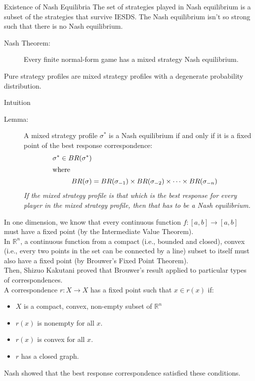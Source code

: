 \documentclass[10pt]{extarticle}
\begin{document}
  \begin{problem}{Existence of Nash Equilibria}
    The set of strategies played in Nash equilibrium is a subset of the strategies that survive IESDS. The Nash equilibrium isn't so strong such that there is no Nash equilibrium.

    \begin{description}
      \item[Nash Theorem:] Every finite normal-form game has a mixed strategy Nash equilibrium.
    \end{description}
    \begin{description}
      \tiny
      \item[Note:] Pure strategy profiles are mixed strategy profiles with a degenerate probability distribution.
    \end{description}
    \begin{problem}{Intuition}
      \begin{description}
        \item[Lemma:] A mixed strategy profile $\sigma^*$ is a Nash equilibrium if and only if it is a fixed point of the best response correspondence:
          \begin{align*}
            \sigma^* \in BR(\sigma^*)\\
            \shortintertext{where}
            BR(\sigma) &= BR(\sigma_{-1}) \times BR(\sigma_{-2})\times\cdots\times BR(\sigma_{-n})
          \end{align*}
          \textit{If the mixed strategy profile is that which is the best response for every player in the mixed strategy profile, then that has to be a Nash equilibrium.}
      \end{description}
      In one dimension, we know that every continuous function $f: [a,b] \rightarrow [a,b]$ must have a fixed point (by the Intermediate Value Theorem).\\

      In $\mathbb{R}^n$, a continuous function from a compact (i.e., bounded and closed), convex (i.e., every two points in the set can be connected by a line) subset to itself must also have a fixed point (by Brouwer's Fixed Point Theorem).\\

      Then, Shizuo Kakutani proved that Brouwer's result applied to particular types of correspondences.\\

      A correspondence $r: X\rightarrow X$ has a fixed point such that $x\in r(x)$ if:
      \begin{itemize}
        \item $X$ is a compact, convex, non-empty subset of $\mathbb{R}^n$
        \item $r(x)$ is nonempty for all $x$.
        \item $r(x)$ is convex for all $x$.
        \item $r$ has a closed graph.
      \end{itemize}
      Nash showed that the best response correspondence satisfied these conditions.
    \end{problem}
  \end{problem}
\end{document}
